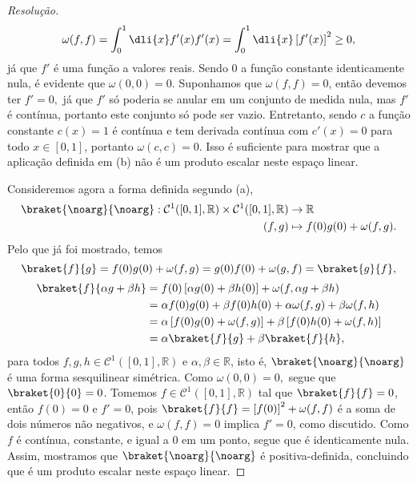 \begin{proof}[Resolução]
   \begin{equation*}
      \omega(f,f) = \int_0^1 \dli{x} f'(x) f'(x) = \int_0^1 \dli{x} \left[f'(x)\right]^2 \geq 0,
   \end{equation*}
   já que \(f'\) é uma função a valores reais. Sendo \(0\) a função constante identicamente nula, é evidente que \(\omega(0,0) = 0\). Suponhamos que \(\omega(f,f) = 0\), então devemos ter \(f' = 0,\) já que \(f'\) só poderia se anular em um conjunto de medida nula, mas \(f'\) é contínua, portanto este conjunto só pode ser vazio. Entretanto, sendo \(c\) a função constante \(c(x) = 1\) é contínua e tem derivada contínua com \(c'(x) = 0\) para todo \(x \in [0,1]\), portanto \(\omega(c,c) = 0\). Isso é suficiente para mostrar que a aplicação definida em (b) não é um produto escalar neste espaço linear.

   Consideremos agora a forma definida segundo (a),
   \begin{align*}
      \braket{\noarg}{\noarg}: \mathcal{C}^1([0,1], \mathbb{R}) \times \mathcal{C}^1([0,1], \mathbb{R}) &\to \mathbb{R}\\
      (f,g) &\mapsto f(0) g(0) + \omega(f,g).
   \end{align*}
   Pelo que já foi mostrado, temos
   \begin{equation*}
      \braket{f}{g} = f(0) g(0) + \omega(f, g) = g(0) f(0) + \omega(g, f) = \braket{g}{f},
   \end{equation*}
   \begin{align*}
      \braket{f}{\alpha g + \beta h} &= f(0) \left[\alpha g(0) + \beta h(0)\right] + \omega(f, \alpha g + \beta h)\\
                                     &= \alpha f(0) g(0) + \beta f(0) h(0) + \alpha \omega(f, g) + \beta \omega(f, h)\\
                                     &= \alpha \left[f(0) g(0) + \omega(f,g)\right] + \beta \left[f(0) h(0) + \omega(f,h)\right]\\
                                     &= \alpha \braket{f}{g} + \beta \braket{f}{h},
   \end{align*}
   para todos \(f,g,h \in \mathcal{C}^1([0,1], \mathbb{R})\) e \(\alpha, \beta \in \mathbb{R}\), isto é, \(\braket{\noarg}{\noarg}\) é uma forma sesquilinear simétrica. Como \(\omega(0,0) = 0,\) segue que \(\braket{0}{0} = 0\). Tomemos \(f \in \mathcal{C}^1([0,1], \mathbb{R})\) tal que \(\braket{f}{f} = 0\), então \(f(0) = 0\) e \(f' = 0\), pois \(\braket{f}{f} = \left[f(0)\right]^2 + \omega(f,f)\) é a soma de dois números não negativos, e \(\omega(f,f) = 0\) implica \(f' = 0\), como discutido. Como \(f\) é contínua, constante, e igual a \(0\) em um ponto, segue que é identicamente nula. Assim, mostramos que \(\braket{\noarg}{\noarg}\) é positiva-definida, concluindo que é um produto escalar neste espaço linear.
\end{proof}
